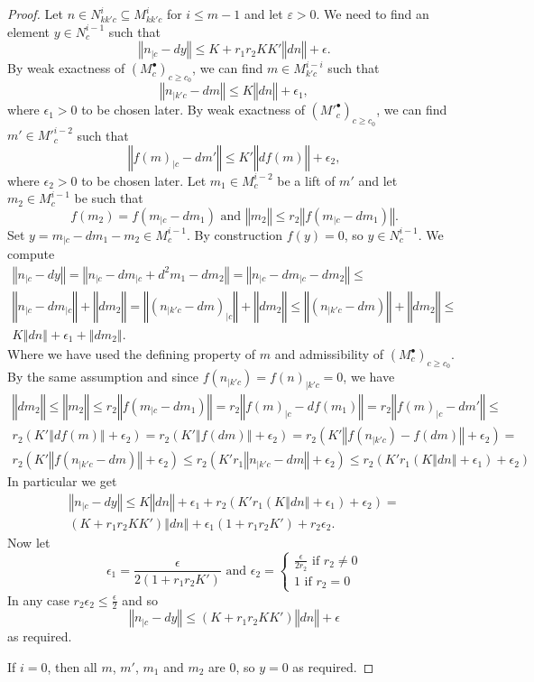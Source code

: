 \begin{proof}
\leanok
Let $n \in N^i_{kk'c} \subseteq M^i_{kk'c}$ for $i\leq m-1$ and let $ε > 0$. We need to find an element $y \in N^{i-1}_c$ such that
\[
  ‖n_{|c} - dy‖ \leq K + r_1r_2KK'‖dn‖ + \epsilon.
\]
By weak exactness of $(M^\bullet_c)_{c\geq c_0}$, we can find $m \in M^{i-i}_{k'c}$ such that
\[
  ‖n_{|k'c} - dm‖ \leq K‖dn‖ + \epsilon_1,
\]
where $\epsilon_1 > 0$ to be chosen later. By weak exactness of $(M'^\bullet_c)_{c\geq c_0}$, we can find $m' \in M'^{i-2}_c$ such that
\[
  ‖f(m)_{|c} - dm'‖ \leq K'‖df(m)‖ + \epsilon_2,
\]
where $\epsilon_2 > 0$ to be chosen later. Let $m_1 \in M^{i-2}_c$ be a lift of $m'$ and let $m_2 \in M^{i-1}_c$ be such that
\[
f(m_2) = f(m_{|c} - dm_1) \mbox{ and } ‖m_2‖ \leq r_2 ‖f(m_{|c} - dm_1)‖.
\]
Set $y = m_{|c} - dm_1 - m_2 \in M^{i-1}_c$. By construction $f(y) = 0$, so $y \in N^{i-1}_c$. We compute
\begin{gather*}
‖n_{|c} - dy‖ = ‖n_{|c} - dm_{|c} + d^2m_1 - dm_2‖ = ‖n_{|c} - dm_{|c} - dm_2‖ \leq \\
‖n_{|c} - dm_{|c} ‖ + ‖dm_2‖ = ‖(n_{|k'c} - dm)_{|c}‖ + ‖dm_2‖ \leq ‖(n_{|k'c} - dm)‖ + ‖dm_2‖ \leq \\
K‖dn‖ + \epsilon_1 + ‖dm_2‖.
\end{gather*}
Where we have used the defining property of $m$ and admissibility of $(M^\bullet_c)_{c\geq c_0}$. By the same assumption and since $f(n_{|k'c}) = f(n)_{|k'c} = 0$, we have
\begin{gather*}
‖dm_2‖ \leq ‖m_2‖ \leq  r_2 ‖f(m_{|c} - dm_1)‖ = r_2 ‖f(m)_{|c} - df(m_1)‖ = r_2 ‖f(m)_{|c} - dm'‖ \leq \\
r_2(K'‖df(m)‖ + \epsilon_2) = r_2(K'‖f(dm)‖ + \epsilon_2) = r_2(K'‖f(n_{|k'c}) - f(dm)‖ + \epsilon_2) = \\
r_2(K'‖f(n_{|k'c} - dm)‖ + \epsilon_2) \leq r_2(K'r_1‖n_{|k'c} - dm‖ + \epsilon_2) \leq r_2(K'r_1(K‖dn‖ + \epsilon_1) + \epsilon_2)
\end{gather*}
In particular we get
\begin{gather*}
‖n_{|c} - dy‖ \leq K‖dn‖ + \epsilon_1 + r_2(K'r_1(K‖dn‖ + \epsilon_1) + \epsilon_2) =
\\(K + r_1r_2KK')‖dn‖ + \epsilon_1(1+r_1r_2K') + r_2\epsilon_2.
\end{gather*}
Now let
\[
\epsilon_1 = \frac{\epsilon}{2(1+r_1r_2K')} \mbox{ and } \epsilon_2 = \begin{cases}
                                                                    \frac{\epsilon}{2r_2} \mbox{ if } r_2 \neq 0 \\
                                                                    1 \mbox{ if } r_2 = 0
                                                                      \end{cases}
\]
In any case $r_2 \epsilon_2 \leq \frac{\epsilon}{2}$ and so
\[
‖n_{|c} - dy‖ \leq (K + r_1r_2KK')‖dn‖ + \epsilon
\]
as required.

If $i=0$, then all $m$, $m'$, $m_1$ and $m_2$ are $0$, so $y=0$ as required.
\end{proof}

